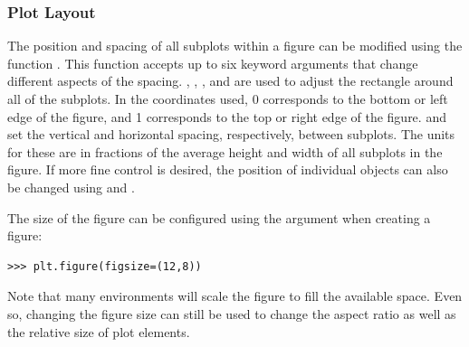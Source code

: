 \subsubsection*{Plot Layout} %
The position and spacing of all subplots within a figure can be modified using the function .
This function accepts up to six keyword arguments that change different aspects of the spacing.
, , , and  are used to adjust the rectangle around all of the subplots.
In the coordinates used, 0 corresponds to the bottom or left edge of the figure, and 1 corresponds to the top or right edge of the figure.
 and  set the vertical and horizontal spacing, respectively, between subplots.
The units for these are in fractions of the average height and width of all subplots in the figure.
%
If more fine control is desired, the position of individual  objects can also be changed using  and .

The size of the figure can be configured using the  argument when creating a figure:
\begin{lstlisting}
>>> plt.figure(figsize=(12,8))
\end{lstlisting}
Note that many environments will scale the figure to fill the available space.
Even so, changing the figure size can still be used to change the aspect ratio as well as the relative size of plot elements.

